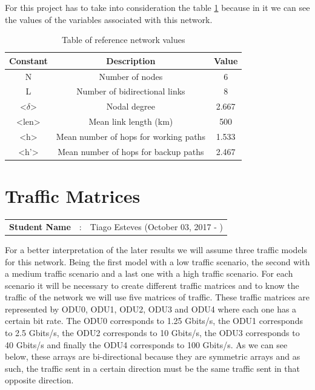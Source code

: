 \newpage
For this project has to take into consideration the table \ref{table_ref_net} because in it we can see the values of the variables associated with this network.\\

\begin{table}[h!]
\centering
\begin{tabular}{|| c | c | c||}
 \hline
 Constant & Description & Value \\
 \hline\hline
 N & Number of nodes & 6 \\
 L & Number of bidirectional links & 8 \\
 <$\delta$> & Nodal degree & 2.667 \\
 <len> & Mean link length (km) & 500 \\
 <h> & Mean number of hops for working paths & 1.533 \\
 <h'> & Mean number of hops for backup paths & 2.467 \\
 \hline
\end{tabular}
\caption{Table of reference network values}
\label{table_ref_net}
\end{table}


\section{Traffic Matrices}\label{Reference_Network_Traffic}
\begin{tcolorbox}	
\begin{tabular}{p{2.75cm} p{0.2cm} p{10.5cm}} 	
\textbf{Student Name}  &:& Tiago Esteves    (October 03, 2017 - )\\
\end{tabular}
\end{tcolorbox}
\vspace{11pt}

For a better interpretation of the later results we will assume three traffic models for this network.
Being the first model with a low traffic scenario, the second with a medium traffic scenario and a last one with a high traffic scenario.
For each scenario it will be necessary to create different traffic matrices and to know the traffic of the network we will use five matrices of traffic.
These traffic matrices are represented by ODU0, ODU1, ODU2, ODU3 and ODU4 where each one has a certain bit rate.
The ODU0 corresponds to 1.25 Gbits/s, the ODU1 corresponds to 2.5 Gbits/s, the ODU2 corresponds to 10 Gbits/s, the ODU3 corresponds to 40 Gbits/s and finally the ODU4 corresponds to 100 Gbits/s.
As we can see below, these arrays are bi-directional because they are symmetric arrays and as such, the traffic sent in a certain direction must be the same traffic sent in that opposite direction.

